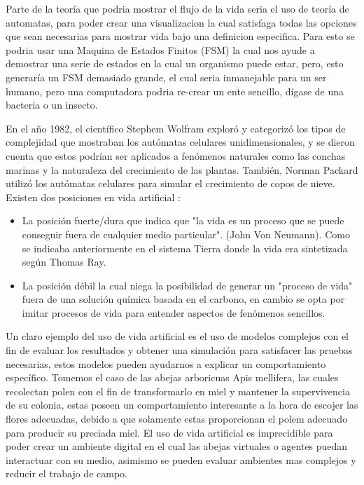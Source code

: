 \documentclass[conference]{IEEEtran}
\begin{document}
Parte de la teor\'ia que podria mostrar el flujo de la vida seria el uso de teor\'ia de automatas, para poder crear una visualizacion la cual satisfaga todas las opciones que sean necesarias para mostrar vida bajo una definicion especifica. Para esto se podria usar una Maquina de Estados Finitos (FSM) \cite{MARG01} la cual nos ayude a demostrar una serie de estados en la cual un organismo puede estar, pero, esto generar\'ia un FSM demasiado grande, el cual seria inmanejable para un ser humano, pero una computadora podria re-crear un ente sencillo, d\'igase de una bacteria o un insecto.  

En el a\~no 1982, el cient\'ifico Stephem Wolfram explor\'o y categoriz\'o los tipos de complejidad que mostraban los autómatas celulares unidimensionales, y se dieron cuenta que estos podr\'ian ser aplicados a fen\'omenos naturales como las conchas marinas y la naturaleza del crecimiento de las plantas. Tambi\'en, Norman Packard utiliz\'o los aut\'omatas celulares para simular el crecimiento de copos de nieve. \cite{VAD01} \\
Existen dos posiciones en vida artificial\cite{VAD01} :
\begin{itemize}
\item La posici\'on fuerte/dura que indica que "la vida es un proceso que se puede conseguir fuera de cualquier medio particular". (John Von Neumann). Como se indicaba anteriormente en el sistema Tierra donde la vida era sintetizada seg\'un Thomas Ray.
\item La posici\'on d\'ebil la cual niega la posibilidad de generar un "proceso de vida" fuera de una soluci\'on qu\'imica basada en el carbono, en cambio se opta por imitar procesos de vida para entender aspectos de fen\'omenos sencillos.
\end{itemize}


Un claro ejemplo del uso de vida artificial es el uso de modelos complejos con el fin de evaluar los resultados y obtener una simulaci\'on para satisfacer las pruebas necesarias, estos modelos pueden ayudarnos a explicar un comportamiento espec\'ifico. Tomemos el caso de las abejas arboricuas Apis mellifera, las cuales recolectan polen con el fin de transformarlo en miel y mantener la supervivencia de su colonia, estas poseen un comportamiento interesante a la hora de escojer las flores adecuadas, debido a que solamente estas proporcionan el polem adecuado para producir su preciada miel. \cite{ZOE01} El uso de vida artificial es imprecidible para poder crear un ambiente digital en el cual las abejas virtuales o agentes puedan interactuar con su medio, asimismo se pueden evaluar ambientes mas complejos y reducir el trabajo de campo. 
\end{document}
